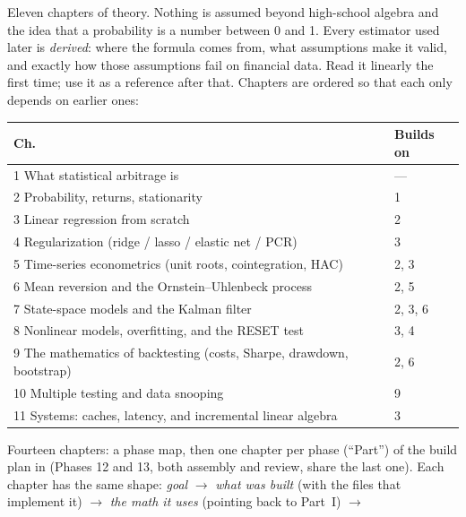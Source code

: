\begin{description}[leftmargin=0pt,style=nextline]
  \item[Part I --- The Mathematics, From Nothing.] Eleven chapters of theory. Nothing
    is assumed beyond high-school algebra and the idea that a probability is a number
    between 0 and 1. Every estimator used later is \emph{derived}: where the formula
    comes from, what assumptions make it valid, and exactly how those assumptions fail
    on financial data. Read it linearly the first time; use it as a reference after
    that. Chapters are ordered so that each only depends on earlier ones:
    \begin{center}
      \begin{tabular}{ll}
        \toprule
        Ch. & Builds on \\
        \midrule
        1 What statistical arbitrage is & --- \\
        2 Probability, returns, stationarity & 1 \\
        3 Linear regression from scratch & 2 \\
        4 Regularization (ridge / lasso / elastic net / PCR) & 3 \\
        5 Time-series econometrics (unit roots, cointegration, HAC) & 2, 3 \\
        6 Mean reversion and the Ornstein--Uhlenbeck process & 2, 5 \\
        7 State-space models and the Kalman filter & 2, 3, 6 \\
        8 Nonlinear models, overfitting, and the RESET test & 3, 4 \\
        9 The mathematics of backtesting (costs, Sharpe, drawdown, bootstrap) & 2, 6 \\
        10 Multiple testing and data snooping & 9 \\
        11 Systems: caches, latency, and incremental linear algebra & 3 \\
        \bottomrule
      \end{tabular}
    \end{center}
  \item[Part II --- The Project, Phase by Phase.] Fourteen chapters: a phase map, then
    one chapter per phase (``Part'') of the build plan in  (Phases 12 and 13,
    both assembly and review, share the last one). Each chapter has the same shape:
    \emph{goal} $\rightarrow$ \emph{what was built} (with the files that implement it)
    $\rightarrow$ \emph{the math it uses} (pointing back to Part~I) $\rightarrow$

\end{description}
